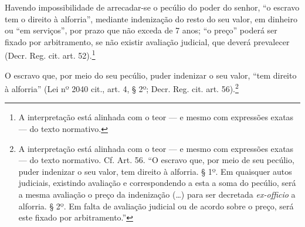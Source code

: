Havendo impossibilidade de arrecadar-se o pecúlio do poder do senhor, ``o
escravo tem o direito à alforria'', mediante indenização do resto do seu
valor, em dinheiro ou ``em serviços'', por prazo que não exceda de 7 anos;
``o preço'' poderá ser fixado por arbitramento, se não existir avaliação
judicial, que deverá prevalecer (Decr. Reg. cit. art. 52).\footnote{A
  interpretação está alinhada com o teor --- e mesmo com expressões exatas ---
  do texto normativo.}

O escravo que, por meio do seu pecúlio, puder indenizar o seu valor,
``tem direito à alforria'' (Lei nº 2040 cit., art. 4, § 2º; Decr. Reg.
cit. art. 56).\footnote{A interpretação está alinhada com o teor --- e %
  mesmo com expressões exatas --- do texto normativo. Cf. Art. 56. ``O escravo
  que, por meio de seu pecúlio, puder indenizar o seu valor, tem direito
  à alforria. § 1º. Em quaisquer autos judiciais, existindo avaliação e
  correspondendo a esta a soma do pecúlio, será a mesma avaliação o
  preço da indenização (\ldots{}) para ser decretada \emph{ex-officio} a
  alforria. § 2º. Em falta de avaliação judicial ou de acordo sobre o
  preço, será este fixado por arbitramento.''}

